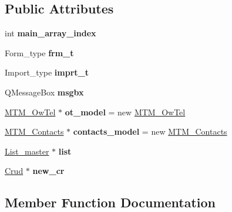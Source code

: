 \subsection*{Public Attributes}
\begin{DoxyCompactItemize}
\item 
\mbox{\label{class_update_aed674284f01e29589d752926a3c8e00b}} 
int {\bfseries main\+\_\+array\+\_\+index}
\item 
\mbox{\label{class_update_ae38a0fdc0a58f52522650bd35a868dbe}} 
Form\+\_\+type {\bfseries frm\+\_\+t}
\item 
\mbox{\label{class_update_aa9e11fa0a16c34e7037f1c30483c1ad4}} 
Import\+\_\+type {\bfseries imprt\+\_\+t}
\item 
\mbox{\label{class_update_ad8a73824032973ca372e5e2029e69fb7}} 
Q\+Message\+Box {\bfseries msgbx}
\item 
\mbox{\label{class_update_ab721a08f729e010ee919468994576d23}} 
\mbox{\hyperlink{class_m_t_m___ow_tel}{M\+T\+M\+\_\+\+Ow\+Tel}} $\ast$ {\bfseries ot\+\_\+model} = new \mbox{\hyperlink{class_m_t_m___ow_tel}{M\+T\+M\+\_\+\+Ow\+Tel}}
\item 
\mbox{\label{class_update_a385d86d29afed06312334355a89449a1}} 
\mbox{\hyperlink{class_m_t_m___contacts}{M\+T\+M\+\_\+\+Contacts}} $\ast$ {\bfseries contacts\+\_\+model} = new \mbox{\hyperlink{class_m_t_m___contacts}{M\+T\+M\+\_\+\+Contacts}}
\item 
\mbox{\label{class_update_a1223af56ab7bef7b5fe0d5db578abef7}} 
\mbox{\hyperlink{class_list__master}{List\+\_\+master}} $\ast$ {\bfseries list}
\item 
\mbox{\label{class_update_a81dc5ecd6f0b9baba09118ffc6a8a45b}} 
\mbox{\hyperlink{class_crud}{Crud}} $\ast$ {\bfseries new\+\_\+cr}
\end{DoxyCompactItemize}


\subsection{Member Function Documentation}
\mbox{\label{class_update_a4bd50fb5eb9794ac0922b886f5f7808d}} 
